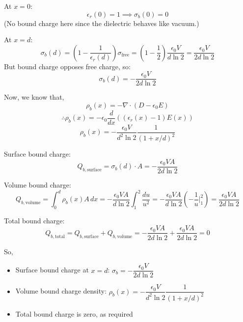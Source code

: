 \documentclass[a4paper]{article}
\begin{document}
\begin{tcolorbox}
At \( x = 0 \):
\[
\epsilon_r(0) = 1 \implies \sigma_b(0) = 0
\]
(No bound charge here since the dielectric behaves like vacuum.)

At \( x = d \):
\[
\sigma_b(d) = \left(1 - \frac{1}{\epsilon_r(d)}\right) \sigma_{\text{free}} = \left(1 - \frac{1}{2}\right) \frac{\epsilon_0 V}{d \ln 2} = \frac{\epsilon_0 V}{2 d \ln 2}
\]
But bound charge opposes free charge, so:
\[
\boxed{\sigma_b(d) = -\frac{\epsilon_0 V}{2 d \ln 2}}
\]

Now, we know that,
\[
\rho_b(x) = -\nabla \cdot (D - \epsilon_0 E)
\]
\[
\therefore \rho_b(x) = -\epsilon_0 \frac{d}{dx} \left( (\epsilon_r(x) - 1) E(x) \right)
\]
\[
\boxed{\rho_b(x) = -\frac{\epsilon_0 V}{d^2 \ln 2} \frac{1}{(1 + x/d)^2}}
\]

Surface bound charge:
\[
Q_{b,\text{surface}} = \sigma_b(d) \cdot A = \boxed{-\frac{\epsilon_0 V A}{2 d \ln 2}}
\]

Volume bound charge:
\[
Q_{b,\text{volume}} = \int_0^d \rho_b(x) A \, dx = -\frac{\epsilon_0 V A}{d \ln 2} \int_1^2 \frac{du}{u^2} = -\frac{\epsilon_0 V A}{d \ln 2} \left( -\frac{1}{u} \Bigg|_1^2 \right) = \boxed{\frac{\epsilon_0 V A}{2 d \ln 2}}
\]

Total bound charge:
\[
Q_{b,\text{total}} = Q_{b,\text{surface}} + Q_{b,\text{volume}} = -\frac{\epsilon_0 V A}{2 d \ln 2} + \frac{\epsilon_0 V A}{2 d \ln 2} = 0
\]

\vspace{0.5cm}
So,
\begin{itemize}
    \item Surface bound charge at \( x = d \): \(\sigma_b = -\dfrac{\epsilon_0 V}{2d \ln 2}\)
    \item Volume bound charge density: \(\rho_b(x) = -\dfrac{\epsilon_0 V}{d^2 \ln 2}\dfrac{1}{(1 + x/d)^2}\)
    \item Total bound charge is zero, as required
\end{itemize}
\end{tcolorbox}

\vspace{1\baselineskip}
\end{document}
